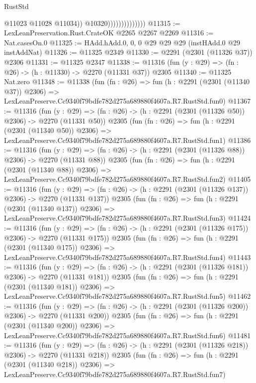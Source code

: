 \begin{lexlean}{RustStd}
\begin{coremodule}
                                    @11023
                                    @11028
                                    @11034))
                                @10320))))))))))))))
@11315 := LexLeanPreservation.Rust.CrateOK @2265 @2267 @2269
@11316 := Nat.casesOn.{0}
@11325 := HAdd.hAdd.{0, 0, 0} @29 @29 @29 (instHAdd.{0} @29 instAddNat)
@11326 := @11325 @2349
@11330 := @2291 (@2301 (@11326 @37)) @2306
@11331 := @11325 @2347
@11338 := @11316 (fun (y : @29) => (fn : @26) -> (h : @11330) -> @2270 (@11331 @37)) @2305
@11340 := @11325 Nat.zero
@11348 := @11338
    (fun (fn : @26) =>
    fun (h : @2291 (@2301 (@11340 @37)) @2306) =>
    LexLeanPreserve.Cc9340f79bdfe782d275a689880f4607a.R7.RustStd.fun0)
@11367 := @11316
    (fun (y : @29) => (fn : @26) -> (h : @2291 (@2301 (@11326 @50)) @2306) -> @2270 (@11331 @50))
    @2305
    (fun (fn : @26) =>
    fun (h : @2291 (@2301 (@11340 @50)) @2306) =>
    LexLeanPreserve.Cc9340f79bdfe782d275a689880f4607a.R7.RustStd.fun1)
@11386 := @11316
    (fun (y : @29) => (fn : @26) -> (h : @2291 (@2301 (@11326 @88)) @2306) -> @2270 (@11331 @88))
    @2305
    (fun (fn : @26) =>
    fun (h : @2291 (@2301 (@11340 @88)) @2306) =>
    LexLeanPreserve.Cc9340f79bdfe782d275a689880f4607a.R7.RustStd.fun2)
@11405 := @11316
    (fun (y : @29) => (fn : @26) -> (h : @2291 (@2301 (@11326 @137)) @2306) -> @2270 (@11331 @137))
    @2305
    (fun (fn : @26) =>
    fun (h : @2291 (@2301 (@11340 @137)) @2306) =>
    LexLeanPreserve.Cc9340f79bdfe782d275a689880f4607a.R7.RustStd.fun3)
@11424 := @11316
    (fun (y : @29) => (fn : @26) -> (h : @2291 (@2301 (@11326 @175)) @2306) -> @2270 (@11331 @175))
    @2305
    (fun (fn : @26) =>
    fun (h : @2291 (@2301 (@11340 @175)) @2306) =>
    LexLeanPreserve.Cc9340f79bdfe782d275a689880f4607a.R7.RustStd.fun4)
@11443 := @11316
    (fun (y : @29) => (fn : @26) -> (h : @2291 (@2301 (@11326 @181)) @2306) -> @2270 (@11331 @181))
    @2305
    (fun (fn : @26) =>
    fun (h : @2291 (@2301 (@11340 @181)) @2306) =>
    LexLeanPreserve.Cc9340f79bdfe782d275a689880f4607a.R7.RustStd.fun5)
@11462 := @11316
    (fun (y : @29) => (fn : @26) -> (h : @2291 (@2301 (@11326 @200)) @2306) -> @2270 (@11331 @200))
    @2305
    (fun (fn : @26) =>
    fun (h : @2291 (@2301 (@11340 @200)) @2306) =>
    LexLeanPreserve.Cc9340f79bdfe782d275a689880f4607a.R7.RustStd.fun6)
@11481 := @11316
    (fun (y : @29) => (fn : @26) -> (h : @2291 (@2301 (@11326 @218)) @2306) -> @2270 (@11331 @218))
    @2305
    (fun (fn : @26) =>
    fun (h : @2291 (@2301 (@11340 @218)) @2306) =>
    LexLeanPreserve.Cc9340f79bdfe782d275a689880f4607a.R7.RustStd.fun7)

\end{coremodule}
\end{lexlean}
